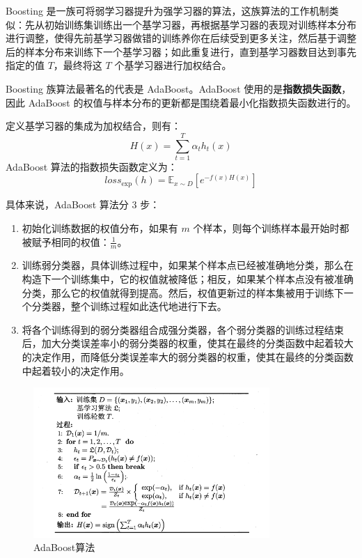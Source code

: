 \documentclass[12pt, a4paper]{article} %
\begin{document}
Boosting 是一族可将弱学习器提升为强学习器的算法，这族算法的工作机制类似：先从初始训练集训练出一个基学习器，再根据基学习器的表现对训练样本分布进行调整，使得先前基学习器做错的训练养你在后续受到更多关注，然后基于调整后的样本分布来训练下一个基学习器；如此重复进行，直到基学习器数目达到事先指定的值 $T$，最终将这 $T$ 个基学习器进行加权结合。

Boosting 族算法最著名的代表是 AdaBoost。AdaBoost 使用的是\textbf{指数损失函数}，因此 AdaBoost 的权值与样本分布的更新都是围绕着最小化指数损失函数进行的。

定义基学习器的集成为加权结合，则有：
\begin{equation*}
    H(x) = \sum_{t = 1}^{T} \alpha_t h_t (x)
\end{equation*}
AdaBoost 算法的指数损失函数定义为：
\begin{equation*}
    loss_{\exp} (h) = \mathbb{E}_{x \sim D} [e^{- f(x) H(x)}]
\end{equation*}

具体来说，AdaBoost 算法分 3 步：
\begin{enumerate}[\hspace*{2em} i.]
    \item 初始化训练数据的权值分布，如果有 $m$ 个样本，则每个训练样本最开始时都被赋予相同的权值：$\displaystyle \frac{1}{m}$。
    \item 训练弱分类器，具体训练过程中，如果某个样本点已经被准确地分类，那么在构造下一个训练集中，它的权值就被降低；相反，如果某个样本点没有被准确分类，那么它的权值就得到提高。然后，权值更新过的样本集被用于训练下一个分类器，整个训练过程如此迭代地进行下去。
    \item 将各个训练得到的弱分类器组合成强分类器，各个弱分类器的训练过程结束后，加大分类误差率小的弱分类器的权重，使其在最终的分类函数中起着较大的决定作用，而降低分类误差率大的弱分类器的权重，使其在最终的分类函数中起着较小的决定作用。
\end{enumerate}

\begin{figure}[H]
    \centering
    \includegraphics[width=0.8\textwidth]{../img/8-3-AdaBoost算法.png}
    \caption{AdaBoost算法}
    \label{fig:AdaBoost算法}
\end{figure}
\end{document}
